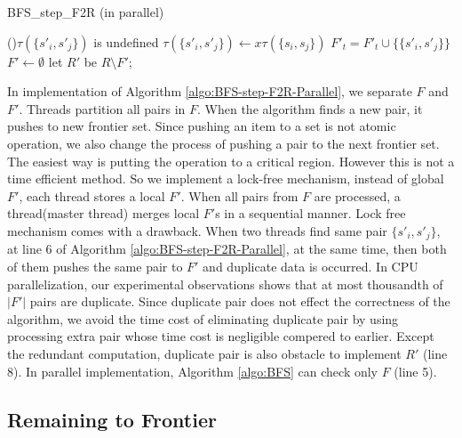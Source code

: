 \documentclass[12pt]{article}
\begin{document}
\begin{algorithm}[ht]
	\caption{BFS\_step\_F2R (in parallel)}
	\label{algo:BFS-step-F2R-Parallel}
	
	
	{
		{
			{
				\If(){$\tau({\{ s'_i,s'_j \}})$ is undefined}
				{
					$\tau(\{ s'_i,s'_j\}) \longleftarrow x \tau(\{ s_i,s_j \})$\;
					$F'_t = F'_t \cup \{ \{ s'_i,s'_j \}  \} $\;
				}
			}
		}
	}
	$F' \longleftarrow \emptyset$\;
	let $R'$ be $R \setminus F'$;
\end{algorithm}

In implementation of Algorithm \ref{algo:BFS-step-F2R-Parallel}, we separate $F$ and $F'$. Threads partition all pairs in $F$. When the algorithm finds a new pair, it pushes to new frontier set. Since pushing an item to a set is not atomic operation, we also change the process of pushing a pair to the next frontier set. The easiest way is putting the operation to a critical region. However this is not a time efficient method. So we implement a lock-free mechanism, instead of global $F'$, each thread stores a local $F'$. When all pairs from $F$ are processed, a thread(master thread) merges local $F'$s in a sequential manner. Lock free mechanism comes with a drawback. When two threads find same pair $\{ s'_i,s'_j\}$, at line 6 of Algorithm \ref{algo:BFS-step-F2R-Parallel}, at the same time, then both of them pushes the same pair to $F'$ and duplicate data is occurred. In CPU parallelization, our experimental observations shows that at most thousandth of $|F'|$ pairs are duplicate. Since duplicate pair does not effect the correctness of the algorithm, we avoid the time cost of eliminating duplicate pair by using processing extra pair whose time cost is negligible compered to earlier. Except the redundant computation, duplicate pair is also obstacle to implement $R'$ (line 8). In parallel implementation, Algorithm  \ref{algo:BFS} can check only $F$ (line 5).  

\subsection{Remaining to Frontier}
\label{sec:BFS-R2F-parallel}
\end{document}
